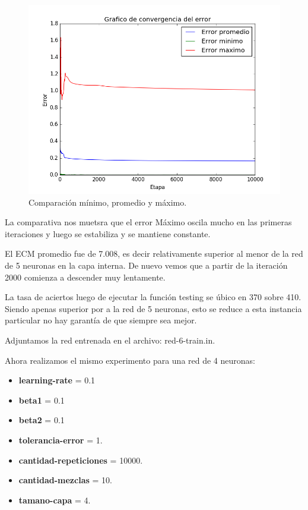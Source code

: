 \documentclass[onecolumn,10pt]{article}
\begin{document}
\begin{figure}[H]
  \centering
  \includegraphics[width=0.8\columnwidth]{red_6_prom.png}
  \caption{Comparación mínimo, promedio y máximo.}
  \label{fig:red promedios}
\end{figure}

La comparativa nos muetsra que el error Máximo oscila mucho en las primeras 
iteraciones y luego se estabiliza y se mantiene constante.

El ECM promedio fue de 7.008, es decir relativamente superior al menor de la red
de 5 neuronas en la capa interna. De nuevo vemos que a partir de la iteración 2000
comienza a descender muy lentamente.

La tasa de aciertos luego de ejecutar la función testing se úbico en 370 sobre 410.
Siendo apenas superior por a la red de 5 neuronas, esto se reduce a esta instancia 
particular no hay garantía de que siempre sea mejor.


Adjuntamos la red entrenada en el archivo: red-6-train.in.

Ahora realizamos el mismo experimento para una red de 4 neuronas:

\begin{itemize}
\item \textbf{learning-rate} = 0.1
\item \textbf{beta1} = 0.1
\item \textbf{beta2} = 0.1
\item \textbf{tolerancia-error} = 1.
\item \textbf{cantidad-repeticiones} = 10000.
\item \textbf{cantidad-mezclas} = 10.
\item \textbf{tamano-capa} = 4.
\end{itemize}
\end{document}
